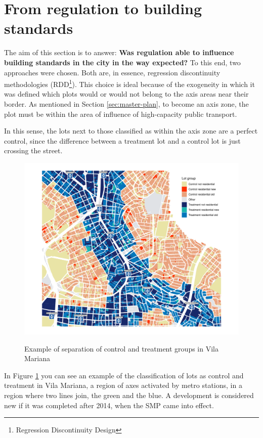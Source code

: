 \clearpage
\section{From regulation to building standards}
\label{sec:perg2}

The aim of this section is to answer: \textbf{Was regulation able to influence building standards in the city in the way expected?} To this end, two approaches were chosen. Both are, in essence, regression discontinuity methodologies (RDD\footnote{Regression Discontinuity Design}). This choice is ideal because of the exogeneity in which it was defined which plots would or would not belong to the axis areas near their border. As mentioned in Section \ref{sec:master-plan}, to become an axis zone, the plot must be within the area of influence of high-capacity public transport.

In this sense, the lots next to those classified as within the axis zone are a perfect control, since the difference between a treatment lot and a control lot is just crossing the street.

\begin{figure}[h]
    \centering
    \caption{Example of separation of control and treatment groups in Vila Mariana}
    \includegraphics[width = .9\textwidth]{figuras/mapa-lotes-metro.pdf}
    \label{fig:mapaRDD}
\end{figure}

In Figure \ref{fig:mapaRDD} you can see an example of the classification of lots as control and treatment in Vila Mariana, a region of axes activated by metro stations, in a region where two lines join, the green and the blue. A development is considered new if it was completed after 2014, when the SMP came into effect.

